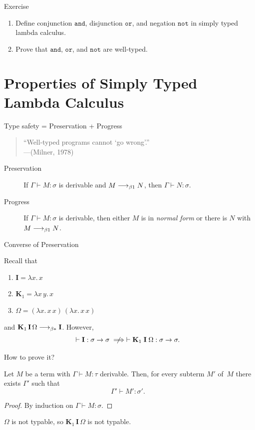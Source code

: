 \begin{frame}{Exercise}
  \begin{enumerate}
    \item Define conjunction $\mathtt{and}$, disjunction $\mathtt{or}$, and
      negation $\mathtt{not}$ in simply typed lambda calculus.

    \item Prove that $\mathtt{and}$, $\mathtt{or}$, and $\mathtt{not}$ are well-typed.
  \end{enumerate}
  
\end{frame}


\section{Properties of Simply Typed Lambda Calculus}


\begin{frame}[c]{Type safety = Preservation + Progress}

\begin{quote}
  ``Well-typed programs cannot `go wrong'.''\\
  \hfill ---(Milner, 1978)
\end{quote}

\begin{description}
  \item[Preservation] If $\Gamma \vdash M : \sigma$ is derivable and $M \longrightarrow_{\beta1} N$, then $\Gamma \vdash N : \sigma$.
  \item[Progress] If $\Gamma \vdash M : \sigma$ is derivable, then either $M$ is in \emph{normal form} or there is $N$ with $M \longrightarrow_{\beta1} N$.
\end{description}

\end{frame}

\begin{frame}[allowframebreaks]{Converse of Preservation}
\begin{example}
  Recall that 
  \begin{enumerate}
    \item $\mathbf{I} = \lambda x.\, x$
    \item $\mathbf{K}_1 = \lambda x\,y.\, x$
    \item $\Omega = (\lambda x.\, x\,x)\,(\lambda x.\, x\,x)$
  \end{enumerate}
  and $\mathbf{K}_1\,\mathbf{I}\,\Omega \longrightarrow_{\beta*} \mathbf{I}$. However, 
  \[
    \vdash \mathbf{I} : \sigma \to \sigma
    \notimplies
    \vdash \mathbf{K}_1\;\mathbf{I}\;\Omega : \sigma \to \sigma.
  \]
\end{example}
How to prove it?
\framebreak
\begin{lemma}
  Let $M$ be a term with $\Gamma \vdash M : \tau$ derivable. Then, for every
  subterm $M'$ of~$M$ there exists $\Gamma'$ such that
  \[
    \Gamma' \vdash M' : \sigma'.
  \]
\end{lemma}
\begin{proof}
  By induction on $\Gamma \vdash M : \sigma$.
\end{proof}
  $\Omega$ is not typable, so $\mathbf{K}_1\,\mathbf{I}\,\Omega$ is not typable.
\end{frame}

